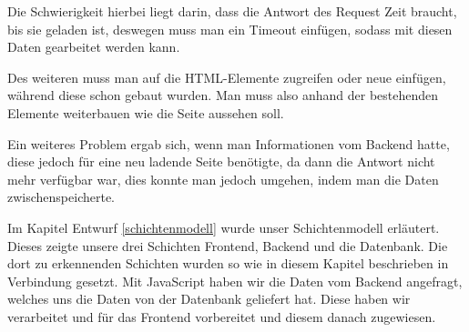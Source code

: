 	Die Schwierigkeit hierbei liegt darin, dass die Antwort des Request Zeit braucht, bis sie geladen ist, deswegen muss man ein Timeout einfügen, sodass mit diesen Daten gearbeitet werden kann.

	Des weiteren muss man auf die \ac{HTML}-Elemente zugreifen oder neue einfügen, während diese schon gebaut wurden. Man muss also anhand der bestehenden Elemente weiterbauen wie die Seite aussehen soll.

	Ein weiteres Problem ergab sich, wenn man Informationen vom Backend hatte, diese jedoch für eine neu ladende Seite benötigte, da dann die Antwort nicht mehr verfügbar war, dies konnte man jedoch umgehen, indem man die Daten zwischenspeicherte.

	
	Im Kapitel Entwurf \vref{schichtenmodell} wurde unser Schichtenmodell erläutert. Dieses zeigte unsere drei Schichten Frontend, Backend und die Datenbank. Die dort zu erkennenden Schichten wurden so wie in diesem Kapitel beschrieben in Verbindung gesetzt. Mit JavaScript haben wir die Daten vom Backend angefragt, welches uns die Daten von der Datenbank geliefert hat. Diese haben wir verarbeitet und für das Frontend vorbereitet und diesem danach zugewiesen.
	
